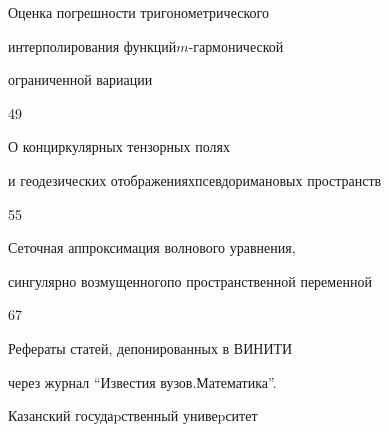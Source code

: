 

{Оценка погрешности тригонометрического


интерполирования функций\newline $m$-гармонической


ограниченной вариации}{49}




{О конциркулярных тензорных полях


и геодезических отображениях\newline псевдоримановых пространств}{55}




{Сеточная аппроксимация волнового уравнения,


сингулярно возмущенного\newline по пространственной переменной}{67}


\medskip





\noindent{}Рефераты статей, депонированных в ВИНИТИ


через журнал ``Известия вузов.\newline Математика''.





\vfill


\noindent\raisebox{2pt}{\copyright} Казанский госудаpственный унивеpситет





